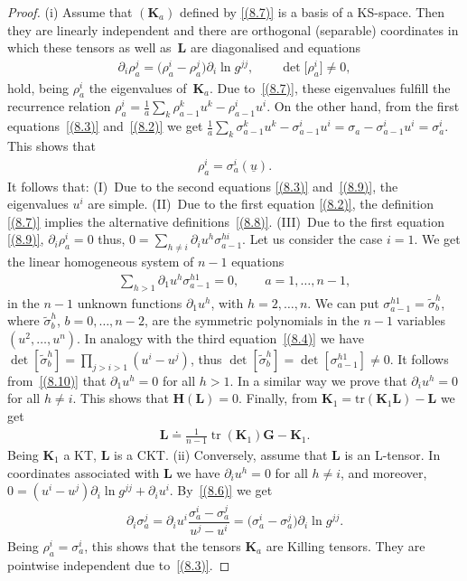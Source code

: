 \documentclass[10pt,a4paper]{amsart}
\def\bs{\boldsymbol}
\numberwithin{equation}{section}
\begin{document}
\begin{proof}
(i) Assume that $(\bs K_a)$ def\/ined by \eqref{(8.7)} is a basis of a KS-space. Then they are linearly independent and there are orthogonal (separable) coordinates in which these tensors as well as~$\bs L$ are diagonalised and equations
\begin{gather}
\partial_i\rho_a^j=\big(\rho_a^i-\rho_a^j\big) \partial_i\ln g^{jj},\qquad \det\big[\rho_a^i\big]\neq 0,
\label{(8.9)}
\end{gather}
hold, being $\rho_a^i$ the eigenvalues of~$\bs K_a$. Due to~\eqref{(8.7)}, these eigenvalues fulf\/ill the recurrence relation
$\rho_a^i=\tfrac 1a \sum_k\rho_{a-1}^ku^k-\rho_{a-1}^i u^i$. On the other hand, from the f\/irst equations~\eqref{(8.3)} and~\eqref{(8.2)} we get $\tfrac 1a \sum_k\sigma_{a-1}^k u^k-\sigma_{a-1}^i u^i=\sigma_a-\sigma_{a-1}^i u^i=\sigma_a^i$. This shows that
\begin{gather*}
\rho_a^i=\sigma_a^i(\underline u).
\end{gather*}
It follows that: (I)~Due to the second equations \eqref{(8.3)} and~\eqref{(8.9)}, the eigenvalues $u^i$ are simple. (II)~Due to the f\/irst equation \eqref{(8.2)}, the def\/inition \eqref{(8.7)} implies the alternative def\/initions~\eqref{(8.8)}. (III)~Due to the f\/irst equation \eqref{(8.9)},  $\partial_i\rho_a^i=0$ thus, $0=\sum\limits_{h\neq i}\partial_iu^h \sigma_{a-1}^{hi}$.
Let us consider the case $i=1$. We get the linear homogeneous system of $n-1$ equations
\begin{gather}
\sum_{h>1}\partial_1u^h \sigma_{a-1}^{h1}=0, \qquad a=1,\ldots,n-1,
\label{(8.10)}
\end{gather}
in the $n-1$ unknown functions $\partial_1u^h$, with $h=2,\ldots,n$.
We can put $\sigma_{a-1}^{h1}=\tilde\sigma_b^h$, where $\tilde\sigma_b^h$, $b=0,\ldots, n-2$, are the symmetric polynomials in the $n-1$ variables $(u^2,\ldots,u^n)$. In analogy with the third equation~\eqref{(8.4)} we have $\det[\tilde\sigma_b^h]=\prod\limits_{j>i>1}(u^i-u^j)$, thus $\det[\tilde\sigma_b^h]=\det[\sigma_{a-1}^{h1}]\neq 0$. It follows from~\eqref{(8.10)} that $\partial_1u^h=0$ for all $h>1$. In a similar way we prove that
$\partial_iu^h=0$  for all $h\neq i$. This shows that $\bs H(\bs L)=0$.
Finally, from $\bs K_1=\text{tr}(\bs K_1\bs L)-\bs L$ we get
\begin{gather}
\bs L\doteq \frac 1{n-1}\operatorname{tr}(\bs K_1) \bs G-\bs K_1.
\label{(8.11)}
\end{gather}
Being $\bs K_1$ a KT, $\bs L$ is a CKT.
(ii) Conversely, assume that $\bs L$ is an L-tensor. In coordinates associated with $\bs L$ we have
$\partial_iu^h=0$ for all $h\neq i$, and moreover, $0=(u^i-u^j)\partial_i\ln g^{jj}+\partial_iu^i$.
By~\eqref{(8.6)} we get
\begin{gather*}
\partial_i\sigma_a^j=\partial_iu^i \dfrac{\sigma_a^i-\sigma_a^j}{u^j-u^i}=\big(\sigma_a^i-\sigma^j_a\big) \partial_i\ln g^{jj}.
\end{gather*}
Being $\rho_a^i=\sigma_a^i$, this shows that the tensors $\bs K_a$ are Killing tensors. They are pointwise independent due to~\eqref{(8.3)}.
\end{proof}
\end{document}
